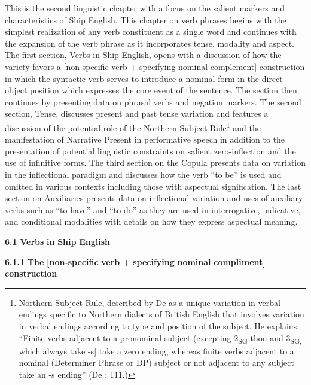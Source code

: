 This is the second linguistic chapter with a focus on the salient markers and characteristics of Ship English. This chapter on verb phrases begins with the simplest realization of any verb constituent as a single word and continues with the expansion of the verb phrase as it incorporates tense, modality and aspect. The first section, Verbs in Ship English, opens with a discussion of how the variety favors a [non-specific verb + specifying nominal complement] construction in which the syntactic verb serves to introduce a nominal form in the direct object position which expresses the core event of the sentence.  The section then continues by presenting data on phrasal verbs and negation markers. The second section, Tense, discusses present and past tense variation and features a discussion of the potential role of the Northern Subject Rule\footnote{Northern Subject Rule, described by De \citet{Haas2006} as a unique variation in verbal endings specific to Northern dialects of British English that involves variation in verbal endings according to type and position of the subject. He explains, “Finite verbs adjacent to a pronominal subject (excepting 2\textsubscript{SG} thou and 3\textsubscript{SG,} which always take -s] take a zero ending, whereas finite verbs adjacent to a nominal (Determiner Phrase or DP) subject or not adjacent to any subject take an -s ending” (De \citealt{Haas2006}: 111.)} and the manifestation of Narrative Present in performative speech in addition to the presentation of potential linguistic constraints on salient zero-inflection and the use of infinitive forms. The third section on the Copula presents data on variation in the inflectional paradigm and discusses how the verb “to be” is used and omitted in various contexts including those with aspectual signification. The last section on Auxiliaries presents data on inflectional variation and uses of auxiliary verbs such as “to have” and “to do” as they are used in interrogative, indicative, and conditional modalities with details on how they express aspectual meaning. 

\textbf{6.1} \textbf{Verbs} \textbf{in} \textbf{Ship} \textbf{English}

  \textbf{6.1.1} \textbf{The} \textbf{[non-specific} \textbf{verb} \textbf{+} \textbf{specifying} \textbf{nominal} \textbf{compliment]} \textbf{construction}

